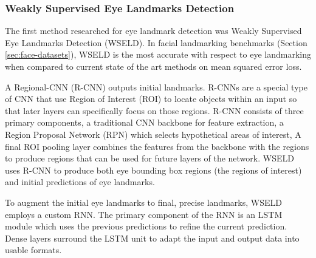 \subsubsection{Weakly Supervised Eye Landmarks Detection}
\label{sec:sweld}


The first method researched for eye landmark detection was Weakly Supervised Eye Landmarks Detection (WSELD)\cite{huang2020eye}. In facial landmarking benchmarks (Section \ref{sec:face-datasets}), WSELD is the most accurate with respect to eye landmarking when compared to current state of the art methods on mean squared error loss.

A Regional-CNN (R-CNN)\cite{ren2015faster} outputs initial landmarks. R-CNNs are a special type of CNN that use Region of Interest (ROI) to locate objects within an input so that later layers can specifically focus on those regions. R-CNN consists of three primary components, a traditional CNN backbone for feature extraction, a Region Proposal Network (RPN) which selects hypothetical areas of interest, A final ROI pooling layer combines the features from the backbone with the regions to produce regions that can be used for future layers of the network. WSELD uses R-CNN to produce both eye bounding box regions (the regions of interest) and initial predictions of eye landmarks.

To augment the initial eye landmarks to final, precise landmarks, WSELD employs a custom RNN. The primary component of the RNN is an LSTM module which uses the previous predictions to refine the current prediction. Dense layers surround the LSTM unit to adapt the input and output data into usable formats.

